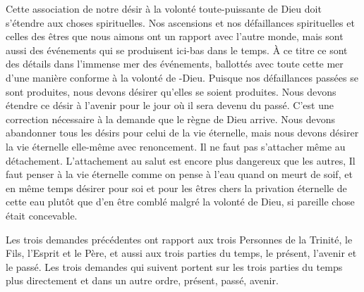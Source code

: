 \documentclass[french,twoside]{book} %
\newenvironment{quoteblock}%
  {\begin{quoting}}
  {\end{quoting}}
\newenvironment{quotebar}{%
    \def\FrameCommand{{\color{rubric!10!}\vrule width 0.5em} \hspace{0.9em}}%
    \def\OuterFrameSep{\itemsep} %
    \MakeFramed {\advance\hsize-\width \FrameRestore}
  }%
  {%
    \endMakeFramed
  }
\renewenvironment{quoteblock}%
  {%
    \savenotes
    \setstretch{0.9}
    \normalfont
    \begin{quotebar}
  }
  {%
    \end{quotebar}
    \spewnotes
  }
\begin{document}
\begin{quoteblock}
 \end{quoteblock}

\noindent Cette association de notre désir à la volonté toute-puissante de Dieu doit s'étendre aux choses spirituelles. Nos ascensions et nos défaillances spirituelles et celles des êtres que nous aimons ont un rapport avec l'autre monde, mais sont aussi des événements qui se produisent ici-bas dans le temps. À ce titre ce sont des détails dans l'immense mer des événements, ballottés avec toute cette mer d'une manière conforme à la volonté de -Dieu. Puisque nos défaillances passées se sont produites, nous devons désirer qu'elles se soient produites. Nous devons étendre ce désir à l'avenir pour le jour où il sera devenu du passé. C'est une correction nécessaire à la demande que le règne de Dieu arrive. Nous devons abandonner tous les désirs pour celui de la vie éternelle, mais nous devons désirer la vie éternelle elle-même avec renoncement. Il ne faut pas s'attacher même au détachement. L'attachement au salut est encore plus dangereux que les autres, Il faut penser à la vie éternelle comme on pense à l'eau quand on meurt de soif, et en même temps désirer pour soi et pour les êtres chers la privation éternelle de cette eau plutôt que d'en être comblé malgré la volonté de Dieu, si pareille chose était concevable.\par
Les trois demandes précédentes ont rapport aux trois Personnes de la Trinité, le Fils, l'Esprit et le Père, et aussi aux trois parties du temps, le présent, l'avenir et le passé. Les trois demandes qui suivent portent sur les trois parties du temps plus directement et dans un autre ordre, présent, passé, avenir.\par

\begin{quoteblock}
 \end{quoteblock}
\end{document}
